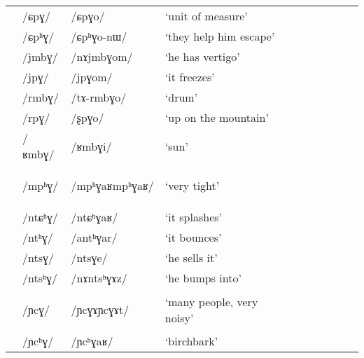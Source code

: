 \documentclass[12pt]{article}
\newcommand{\ipa}[1]{\mbox{\phon/#1/}}
\newcommand{\deux}[1]{\ipa{#1}\addtocounter{2clusters}{1}}
\newcommand{\trois}[1]{\ipa{#1}\addtocounter{3clusters}{1}}
\newcommand{\idph}[1]{\cellcolor{gray}\textbf{#1}}
\newcommand{\resetcounters}[2]{
\newcounter{#1}
\newcounter{#2}
 \setcounter{#1}{\value{2clusters}}
  \setcounter{#2}{\value{3clusters}}
 \setcounter{2clusters}{0}
  \setcounter{3clusters}{0}
}
\begin{document}
\begin{landscape}
\begin{longtable}{llllllllll}
&\deux{ɕpɣ} &\ipa{ɕpɣo} & `unit of measure' & & &\\
 &\trois{ɕpʰɣ} &\ipa{ɕpʰɣo-nɯ} & `they help him escape' & & &\\
 &\trois{jmbɣ} &\ipa{nɤjmbɣom} & `he has vertigo' & & &\\
 &\trois{jpɣ} &\ipa{jpɣom} & `it freezes' & & &\\
 &\trois{rmbɣ} &\ipa{tɤ-rmbɣo} & `drum' & & &\\
 &\trois{rpɣ} &\ipa{ʂpɣo} & `up on the mountain' & & &\\
 &\trois{ʁmbɣ} &\ipa{ʁmbɣi} & `sun' & & &\\
 &\trois{mpʰɣ}\idph{} &\ipa{mpʰɣaʁmpʰɣaʁ} & `very tight' & & &\\    
 &\trois{ntɕʰɣ} &\ipa{ntɕʰɣaʁ} & `it splashes' & & &\\
 &\trois{ntʰɣ} &\ipa{antʰɣar} & `it bounces' & & &\\
 &\trois{ntsɣ} &\ipa{ntsɣe} & `he sells it' & & &\\
 &\trois{ntsʰɣ} &\ipa{nɤntsʰɣɤz} & `he bumps into' & & &\\
 &\trois{ɲcɣ}\idph{} &\ipa{ɲcɣɤɲcɣɤt} & `many people, very noisy' & & &\\
 &\trois{ɲcʰɣ} &\ipa{ɲcʰɣaʁ} & `birchbark' & & &\\
 \bottomrule
\end{longtable} 
\end{landscape} 
\resetcounters{2Cg}{3Cg} %


\ADD{\value{2wC}}{\value{2szC}}{\totdeux}
\ADD{\totdeux}{\value{2lC}}{\totdeux}
\ADD{\totdeux}{\value{2rC}}{\totdeux}
\ADD{\totdeux}{\value{2jcC}}{\totdeux}
\ADD{\totdeux}{\value{2xgC}}{\totdeux}
\ADD{\totdeux}{\value{2xrC}}{\totdeux}
\ADD{\totdeux}{\value{2nmC}}{\totdeux}
\ADD{\totdeux}{\value{2nC}}{\totdeux}
\ADD{\totdeux}{\value{2Cjw}}{\totdeux}
\ADD{\totdeux}{\value{2Clr}}{\totdeux}
\ADD{\totdeux}{\value{2Cg}}{\totdeux}

\ADD{\value{3wC}}{\value{3jcC}}{\tottrois}
\ADD{\tottrois}{\value{3lC}}{\tottrois}
\ADD{\tottrois}{\value{3nmC}}{\tottrois}
\ADD{\tottrois}{\value{3nC}}{\tottrois}
\ADD{\tottrois}{\value{3Cjw}}{\tottrois}
\ADD{\tottrois}{\value{3Clr}}{\tottrois}
\ADD{\tottrois}{\value{3Cg}}{\tottrois}
 
\end{document}
